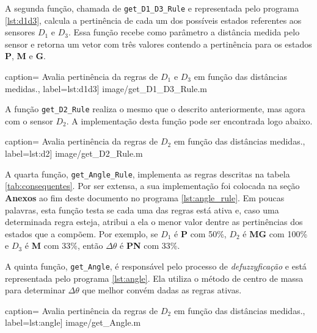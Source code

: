 	\vspace{12pt}
	
	A segunda função, chamada de \texttt{get\_D1\_D3\_Rule} e representada pelo
	programa \ref{lst:d1d3}, calcula a pertinência de cada um dos possíveis estados
	referentes aos sensores \(D_1\) e \(D_3\).	Essa função recebe como parâmetro a
	distância medida pelo sensor e retorna um vetor com três valores contendo a
	pertinência para os estados \textbf{P}, \textbf{M} e \textbf{G}. 
	
	 caption={
	Avalia pertinência da regras de \(D_1\) e \(D_3\) em função das distâncias
	medidas.}, label={lst:d1d3}] {image/get_D1_D3_Rule.m}

	\vspace{12pt}
	
	A função \texttt{get\_D2\_Rule} realiza o mesmo que o descrito anteriormente,
	mas agora com o sensor \(D_2\). A implementação desta função pode ser
	encontrada logo abaixo.
	
	 caption={
	Avalia pertinência da regras de \(D_2\) em função das distâncias
	medidas.}, label={lst:d2}] {image/get_D2_Rule.m} 
	
	\vspace{12pt}
	
	A quarta função, \texttt{get\_Angle\_Rule}, implementa as regras descritas na
	tabela \ref{tab:consequentes}. Por ser extensa, a sua implementação foi
	colocada na seção \textbf{Anexos} ao fim deste documento no programa
	\ref{lst:angle_rule}. Em poucas palavras, esta função testa se cada uma das
	regras está ativa e, caso uma determinada regra esteja, atribui a ela o menor
	valor dentre as pertinências dos estados que a compõem. Por exemplo, se \(D_1\)
	é \textbf{P} com 50\%, \(D_2\) é \textbf{MG} com 100\% e \(D_3\) é \textbf{M}
	com 33\%, então \(\Delta \theta\) é \textbf{PN} com 33\%.
	
	\vspace{12pt}
	
	A quinta função, \texttt{get\_Angle}, é responsável pelo processo de
	\textit{defuzzyficação} e está representada pelo programa \ref{lst:angle}. Ela
	utiliza o método de centro de massa para determinar \(\Delta \theta\) que
	melhor convém dadas as regras ativas.
	
	 caption={
	Avalia pertinência da regras de \(D_2\) em função das distâncias
	medidas.}, label={lst:angle}] {image/get_Angle.m}
	
